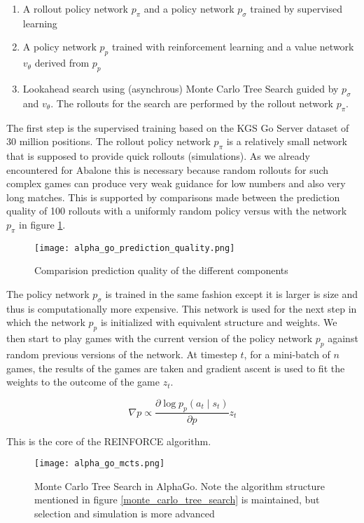 \begin{enumerate}
    \item A rollout policy network $p_{\pi}$ and a policy network $p_{\sigma}$ trained by supervised learning
    \item A policy network $p_p$ trained with reinforcement learning and a value network $v_{\theta}$ derived from $p_p$
    \item Lookahead search using (asynchrous) Monte Carlo Tree Search guided by $p_{\sigma}$ and $v_{\theta}$. The rollouts for the search are performed by the rollout network $p_{\pi}$.
\end{enumerate}

The first step is the supervised training based on the KGS Go Server dataset of 30 million positions. The rollout policy network $p_{\pi}$ is a relatively small network that is supposed to provide quick rollouts (simulations). As we already encountered for Abalone this is necessary because random rollouts for such complex games can produce very weak guidance for low numbers and also very long matches. This is supported by comparisons made between the prediction quality of 100 rollouts with a uniformly random policy versus with the network $p_{\pi}$ in figure \ref{alpha_go_prediction_quality}.

\begin{figure}
    \centering
    \texttt{[image: alpha\_go\_prediction\_quality.png]}
    \caption{Comparision prediction quality of the different components \cite{silver_mastering_2016}}
    \label{alpha_go_prediction_quality}
\end{figure}

The policy network $p_{\sigma}$ is trained in the same fashion except it is larger is size and thus is computationally more expensive. This network is used for the next step in which the network $p_{p}$ is initialized with equivalent structure and weights. We then start to play games with the current version of the policy network $p_{p}$ against random previous versions of the network. At timestep $t$, for a mini-batch of $n$ games, the results of the games are taken and gradient ascent is used to fit the weights to the outcome of the game $z_t$.

$$
    \nabla p \propto \frac{\partial \log p_p(a_t \mid s_t)}{\partial p}z_t
$$

This is the core of the REINFORCE algorithm. \cite{williams_simple_nodate}
\begin{figure}
    \centering
    \texttt{[image: alpha\_go\_mcts.png]}
    \caption{Monte Carlo Tree Search in AlphaGo. \cite{silver_mastering_2016} Note the algorithm structure mentioned in figure \ref{monte_carlo_tree_search} is maintained, but selection and simulation is more advanced}
    \label{alpha_go_mcts}
\end{figure}

